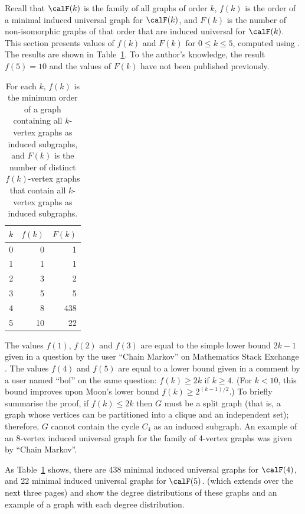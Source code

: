 Recall that $\calF(k)$ is the family of all graphs of order $k$, $f(k)$ is
the order of a minimal induced universal graph for
$\calF(k)$, and $F(k)$ is the number of non-isomorphic graphs of that order
that are induced universal for $\calF(k)$.  This section
presents values of $f(k)$ and $F(k)$ for $0 \leq k \leq 5$, computed
using . The results are shown in 
Table~\ref{tab:graphresults}.  To the author's knowledge, the result
$f(5)=10$ and the values of $F(k)$ have not been published previously.


\begin{table}[h!]
\centering
\footnotesize
\begin{tabular}{r r r}
 \toprule
 $k$ & $f(k)$ & $F(k)$ \\ [0.5ex]
 \midrule
 0 & 0 & 1 \\
 1 & 1 & 1 \\
 2 & 3 & 2 \\
 3 & 5 & 5 \\
 4 & 8 & 438 \\
 5 & 10 & 22 \\
 \bottomrule
\end{tabular}
\caption{For each $k$, $f(k)$ is the minimum order of a graph containing all $k$-vertex graphs as
induced subgraphs, and $F(k)$ is the number of distinct $f(k)$-vertex graphs that contain
all $k$-vertex graphs as induced subgraphs.}
\label{tab:graphresults}
\end{table}


The values $f(1)$, $f(2)$ and $f(3)$ are equal to the simple lower bound $2k
- 1$ given in a question by the user ``Chain Markov'' on Mathematics Stack Exchange
  \citep{math_se_question}.  The values $f(4)$ and $f(5)$ are equal to a lower
  bound given in a comment by a user named ``bof'' on the same question: $f(k) \geq 2k$ if $k
  \geq 4$.  (For $k < 10$, this bound improves upon Moon's lower bound $f(k)
  \geq 2^{(k-1)/2}$.) To briefly summarise the proof, if $f(k) \leq 2k$ then $G$
  must be a split graph (that is, a graph whose vertices can be partitioned
  into a clique and an independent set); therefore, $G$ cannot contain the
  cycle $C_4$ as an induced subgraph.  An example of an 8-vertex induced
  universal graph for the family of 4-vertex graphs was given by
  ``Chain Markov''.
%
%

As Table~\ref{tab:graphresults} shows, there are 438 minimal
induced universal graphs for $\calF(4)$,
and 22 minimal induced universal graphs for $\calF(5)$.
 (which extends over the next
three pages) and
 show the degree distributions
of these graphs and an example of a graph with each degree distribution.


